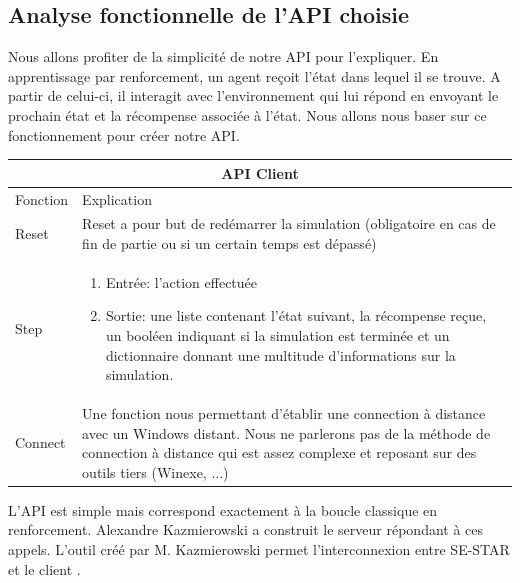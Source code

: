 \subsection{Analyse fonctionnelle de l'\gls{API} choisie}

Nous allons profiter de la simplicité de notre API pour l'expliquer. En apprentissage par renforcement,  un agent reçoit l'état dans lequel il se trouve. A partir de celui-ci, il interagit avec l'environnement qui lui répond en envoyant le prochain état et la récompense associée à l'état. Nous allons nous baser sur ce fonctionnement pour créer notre \gls{API}. 


\bigskip


\setlength{\arrayrulewidth}{.7mm}
\setlength{\tabcolsep}{12pt}
\renewcommand{\arraystretch}{2.}

\begin{center}
{
\begin{tabular}{ |p{2cm}|p{8cm}|  }
\hline
\multicolumn{2}{|c|}{\gls{API} Client} \\
\hline
Fonction & Explication \\
\hline
Reset & Reset a pour but de redémarrer la simulation (obligatoire en cas de fin de partie ou si un certain temps est dépassé) \\
\hline
Step & \begin{enumerate}
\item Entrée: l'action effectuée
\item Sortie: une liste contenant l'état suivant, la récompense reçue, un booléen indiquant si la simulation est terminée et un dictionnaire donnant une multitude d'informations sur la simulation.
\end{enumerate} \\
\hline
Connect & Une fonction nous permettant d'établir une connection à distance avec un Windows distant. Nous ne parlerons pas de la méthode de connection à distance qui est assez complexe et reposant sur des outils tiers (Winexe, ...) \\
\hline
\end{tabular}
}
\end{center}



L'\gls{API} est simple mais correspond exactement à la boucle classique en renforcement. Alexandre Kazmierowski a construit le serveur répondant à ces appels. L'outil créé par M. Kazmierowski permet l'interconnexion entre SE-STAR et le client .

